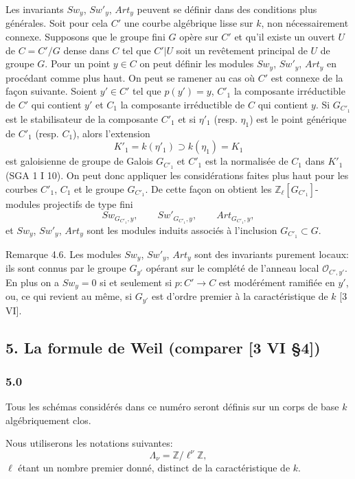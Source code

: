 \documentclass[11pt]{article}
\begin{document}
Les invariants $Sw_y$, $Sw'_y$, $Art_y$ peuvent se définir dans des conditions plus générales. Soit pour cela $C'$ une courbe algébrique lisse sur $k$, non nécessairement connexe. Supposons que le groupe fini $G$ opère sur $C'$ et qu'il existe un ouvert $U$ de $C=C'/G$ dense dans $C$ tel que $C'|U$ soit un revêtement principal de $U$ de groupe $G$. Pour un point $y\in C$ on peut définir les modules $Sw_y$, $Sw'_y$, $Art_y$ en procédant comme plus haut. On peut se ramener au cas où $C'$ est connexe de la façon suivante. Soient $y'\in C'$ tel que $p(y')=y$, $C'_1$ la composante irréductible de $C'$ qui contient $y'$ et $C_1$ la composante irréductible de $C$ qui contient $y$. Si $G_{C'_1}$ est le stabilisateur de la composante $C'_1$ et si $\eta'_1$ (resp. $\eta_1$) est le point générique de $C'_1$ (resp. $C_1$), alors l'extension
\[
K'_1=k(\eta'_1)\supset k(\eta_1)=K_1
\]
est galoisienne de groupe de Galois $G_{C'_1}$ et $C'_1$ est la normalisée de $C_1$ dans $K'_1$ (SGA 1 I 10). On peut donc appliquer les considérations faites plus haut pour les courbes $C'_1$, $C_1$ et le groupe $G_{C'_1}$. De cette façon on obtient les $\mathbb Z_\ell[G_{C'_1}]$-modules projectifs de type fini
\[
Sw_{G_{C'_1},y},\qquad Sw'_{G_{C'_1},y},\qquad Art_{G_{C'_1},y},
\]
et $Sw_y$, $Sw'_y$, $Art_y$ sont les modules induits associés à l'inclusion $G_{C'_1}\subset G$.

Remarque 4.6. Les modules $Sw_y$, $Sw'_y$, $Art_y$ sont des invariants purement locaux: ils sont connus par le groupe $G_{y'}$ opérant sur le complété de l'anneau local $\mathcal O_{C',y'}$. En plus on a $Sw_y=0$ si et seulement si $p:C'\to C$ est modérément ramifiée en $y'$, ou, ce qui revient au même, si $G_{y'}$ est d'ordre premier à la caractéristique de $k$ [3 VI].

\subsection*{5. La formule de Weil (comparer [3 VI §4])}

\subsubsection*{5.0}

Tous les schémas considérés dans ce numéro seront définis sur un corps de base $k$ algébriquement clos.

Nous utiliserons les notations suivantes:
\[
\Lambda_\nu=\mathbb Z/\ell^\nu\mathbb Z,
\]
$\ell$ étant un nombre premier donné, distinct de la caractéristique de $k$.
\end{document}
